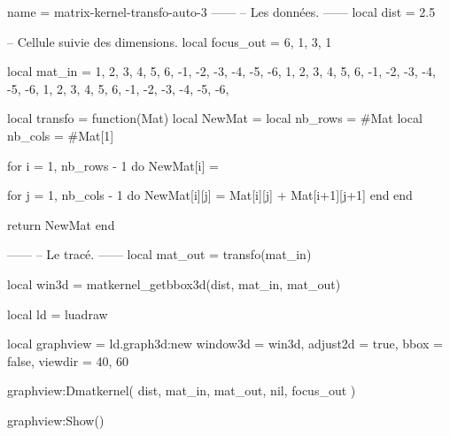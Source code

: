 \documentclass[border = 3pt]{standalone}
\begin{document}
\begin{luadraw*}{name = matrix-kernel-transfo-auto-3}
------
-- Les données.
------
local dist = 2.5

-- Cellule suivie des dimensions.
local focus_out  = { {6, 1}, {3, 1} }

local mat_in = {
  { 1,  2,  3},
  { 4,  5,  6},
  {-1, -2, -3},
  {-4, -5, -6},
  { 1,  2,  3},
  { 4,  5,  6},
  {-1, -2, -3},
  {-4, -5, -6},
  { 1,  2,  3},
  { 4,  5,  6},
  {-1, -2, -3},
  {-4, -5, -6},
}

local transfo = function(Mat)
  local NewMat  = {}
  local nb_rows = #Mat
  local nb_cols = #Mat[1]

  for i = 1, nb_rows - 1 do
    NewMat[i] = {}

    for j = 1, nb_cols - 1 do
      NewMat[i][j] = Mat[i][j] + Mat[i+1][j+1]
    end
  end

  return NewMat
end

------
-- Le tracé.
------
local mat_out = transfo(mat_in)

local win3d = matkernel_getbbox3d(dist, mat_in, mat_out)

local ld = luadraw

local graphview = ld.graph3d:new{
  window3d = win3d,
  adjust2d = true,
  bbox     = false,
  viewdir  = {40, 60}
}

graphview:Dmatkernel(
  dist,
  mat_in, mat_out,
  nil, focus_out
)

graphview:Show()
\end{luadraw*}
\end{document}
